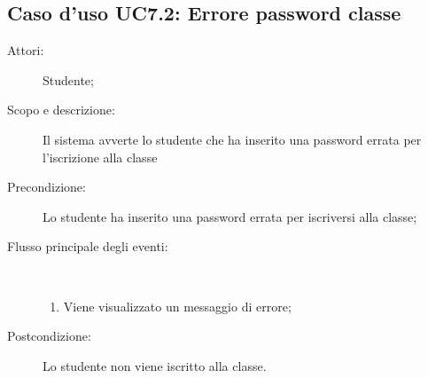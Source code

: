 \subsection{Caso d'uso UC7.2: Errore password classe}\begin{description}
	\item[Attori:] Studente;
	\item[Scopo e descrizione:] Il sistema avverte lo studente che ha inserito una password errata per l'iscrizione alla classe
	\item[Precondizione:] Lo studente ha inserito una password errata per iscriversi alla classe;
	
	\item[Flusso principale degli eventi:] \ 
	\begin{enumerate}
		\item Viene visualizzato un messaggio di errore;
		
	\end{enumerate}
	\item[Postcondizione:] Lo studente non viene iscritto alla classe.
\end{description}
\hypertarget{UC8}{}

